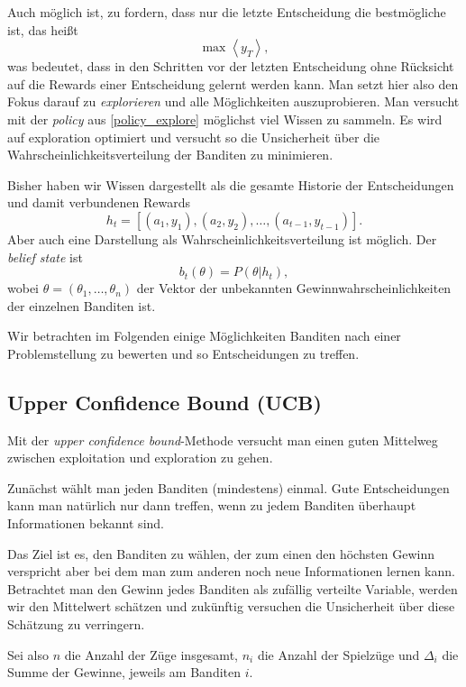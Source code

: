 \documentclass[ngerman]{../LaTeX-Templates/Paper/paper}
\begin{document}
Auch möglich ist, zu fordern, dass nur die letzte Entscheidung die bestmögliche ist, das heißt
\begin{equation}
	\max\left\langle y_T\right\rangle,\label{policy_explore}
\end{equation}
was bedeutet, dass in den Schritten vor der letzten Entscheidung ohne Rücksicht auf die Rewards einer Entscheidung gelernt werden kann. Man setzt hier also den Fokus darauf zu \emph{explorieren} und alle Möglichkeiten auszuprobieren.
Man versucht mit der \emph{policy} aus \autoref{policy_explore} möglichst viel Wissen zu sammeln. Es wird auf exploration optimiert und versucht so die Unsicherheit über die Wahrscheinlichkeitsverteilung der Banditen zu minimieren.

Bisher haben wir Wissen dargestellt als die gesamte Historie der Entscheidungen und damit verbundenen Rewards
\begin{equation*}
	h_t=[(a_1,y_1),(a_2,y_2),\ldots,(a_{t-1},y_{t-1})].
\end{equation*}
Aber auch eine Darstellung als Wahrscheinlichkeitsverteilung ist möglich. Der  \emph{belief state} ist
\begin{equation*}
	b_t(\theta)=P(\theta|h_t),
\end{equation*}
wobei $\theta=(\theta_1,\ldots,\theta_n)$ der Vektor der unbekannten Gewinnwahrscheinlichkeiten der einzelnen Banditen ist.

Wir betrachten im Folgenden einige Möglichkeiten Banditen nach einer Problemstellung zu bewerten und so Entscheidungen zu treffen.
\subsection{Upper Confidence Bound (UCB)}
Mit der \emph{upper confidence bound}-Methode versucht man einen guten Mittelweg zwischen exploitation und exploration zu gehen. 

Zunächst wählt man jeden Banditen (mindestens) einmal. Gute Entscheidungen kann man natürlich nur dann treffen, wenn zu jedem Banditen überhaupt Informationen bekannt sind. 

Das Ziel ist es, den Banditen zu wählen, der zum einen den höchsten Gewinn verspricht aber bei dem man zum anderen noch neue Informationen lernen kann.
Betrachtet man den Gewinn jedes Banditen als zufällig verteilte Variable, werden wir den Mittelwert schätzen und zukünftig versuchen die Unsicherheit über diese Schätzung zu verringern.

Sei also $n$ die Anzahl der Züge insgesamt, $n_i$ die Anzahl der Spielzüge und $\Delta_i$ die Summe der Gewinne, jeweils am Banditen $i$.
\end{document}

